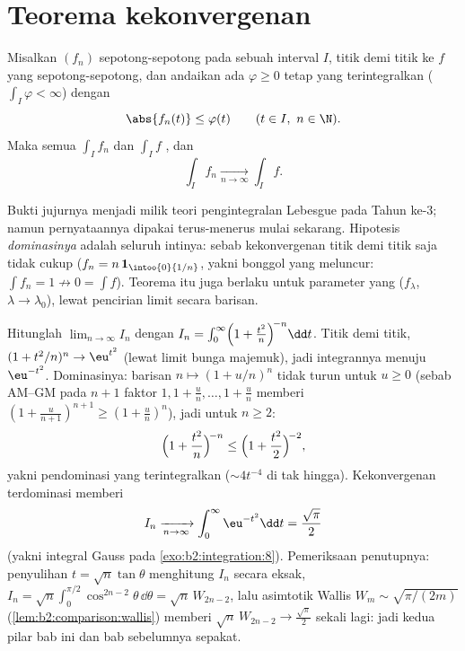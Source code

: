 \section{Teorema kekonvergenan}

\begin{theorem}\label{thm:b2:integration:dominated}
Misalkan $(f_n)$  sepotong-sepotong pada sebuah interval $I$,
 titik demi titik ke $f$ yang  sepotong-sepotong, dan
andaikan ada $\varphi \geq 0$ tetap yang terintegralkan ($\int_I \varphi
< \infty$) dengan
\[
\abs{f_n(t)} \leq \varphi(t) \qquad (t \in I,\ n \in \N).
\]
Maka semua $\int_I f_n$ dan $\int_I f$  , dan
\[
\int_I f_n \xrightarrow[n \to \infty]{} \int_I f .
\]
\end{theorem}
\admitted

\begin{remark}
Bukti jujurnya menjadi milik teori pengintegralan Lebesgue pada Tahun
ke-3; namun pernyataannya dipakai terus-menerus mulai sekarang.
Hipotesis \emph{dominasinya} adalah seluruh intinya: sebab kekonvergenan
titik demi titik saja tidak cukup ($f_n = n\,\mathbf{1}_{\intoo{0}{1/n}}$,
yakni bonggol yang meluncur: $\int f_n = 1 \not\to 0 = \int f$). Teorema
itu juga berlaku untuk parameter yang  ($f_\lambda$, $\lambda \to
\lambda_0$), lewat pencirian limit secara barisan.
\end{remark}

\begin{example}\label{ex:b2:integration:wallislimit}
Hitunglah $\displaystyle\lim_{n\to\infty} I_n$ dengan $I_n =
\int_0^\infty \Bigl(1 + \frac{t^2}{n}\Bigr)^{\!-n}\dd t$.
Titik demi titik, $(1 + t^2/n)^n \to \eu^{t^2}$ (lewat limit
bunga majemuk), jadi integrannya menuju $\eu^{-t^2}$. Dominasinya:
barisan $n \mapsto (1 + u/n)^n$ tidak turun untuk $u \geq 0$
(sebab AM--GM pada $n + 1$ faktor $1, 1 + \frac un, \dots, 1 +
\frac un$ memberi $(1 + \frac u{n+1})^{n+1} \geq (1 + \frac
un)^n$), jadi untuk $n \geq 2$:
\[
\Bigl(1 + \frac{t^2}{n}\Bigr)^{\!-n}
\leq \Bigl(1 + \frac{t^2}{2}\Bigr)^{\!-2},
\]
yakni pendominasi yang terintegralkan ($\sim 4t^{-4}$ di tak hingga).
Kekonvergenan terdominasi memberi
\[
I_n \xrightarrow[n\to\infty]{} \int_0^\infty \eu^{-t^2}\dd t
= \frac{\sqrt\pi}{2}
\]
(yakni integral Gauss pada \cref{exo:b2:integration:8}). Pemeriksaan
penutupnya: penyulihan $t = \sqrt n\tan\theta$ menghitung $I_n$
secara eksak, $I_n = \sqrt n\int_0^{\pi/2}\cos^{2n-2}\theta\,\dd\theta
= \sqrt n\,W_{2n-2}$, lalu asimtotik Wallis $W_m \sim
\sqrt{\pi/(2m)}$ (\cref{lem:b2:comparison:wallis}) memberi $\sqrt
n\,W_{2n-2} \to \frac{\sqrt\pi}2$ sekali lagi: jadi kedua pilar bab ini
dan bab sebelumnya sepakat.
\end{example}

